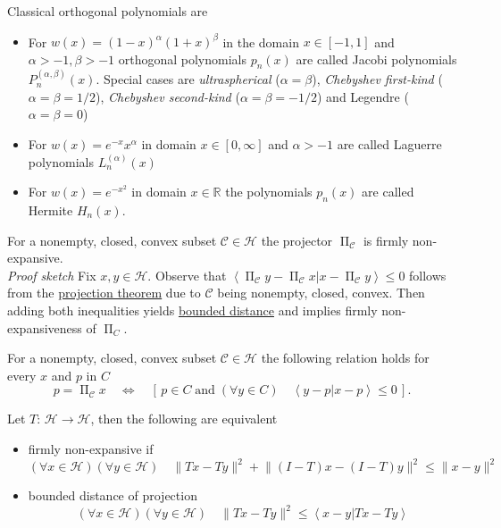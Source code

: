 \documentclass[preview, multi={definition, remark, theorem, proposition, example, literature}, border=0.2in]{standalone}
\DeclareMathOperator{\proj}{\Pi}
\newcommand{\innerp}[2]{\left\langle #1 \vert #2 \right\rangle}
\begin{document}
\begin{definition}[label=18x0c7vo, name=Orthogonal Polynomials]
	\begin{example}[label=m8pnoa7d, name=Classical Polynomials]
		Classical orthogonal polynomials are

		\begin{itemize}
			\item For \( w(x) = (1-x)^\alpha(1+x)^\beta \) in the domain \( x\in[-1,1] \)
				and \( \alpha > -1, \beta > -1 \) orthogonal
				polynomials \( p_n(x) \) are called Jacobi
				polynomials \( P_n^{(\alpha,\beta)}(x) \).
				Special cases are \emph{ultraspherical}
				(\(\alpha=\beta\)), \emph{Chebyshev first-kind}
				(\(\alpha=\beta=1/2\)), \emph{Chebyshev
				second-kind} (\( \alpha=\beta=-1/2 \)) and
				Legendre (\(\alpha=\beta=0\))
			\item For \( w(x) = e^{-x}x^\alpha \) in domain
				\(x\in[0,\infty]\) and \( \alpha > -1 \) are
				called Laguerre polynomials \( L_n^{(\alpha)}(x) \)
			\item For \(w(x) = e^{-x^2}\) in domain \(
				x\in\mathbb{R}\) the polynomials \(p_n(x)\) are
				called Hermite \(H_n(x)\).
		\end{itemize}
	\end{example}
\end{definition}
\begin{theorem}[label=o6y_7uuw, name=Projectors convex sets]
	For a nonempty, closed, convex subset \(\mathcal C \in \mathcal H\) the projector
	\(\proj_{\mathcal{C}}\) is firmly non-expansive. \\

	\textit{Proof sketch} Fix \( x, y \in \mathcal H\). Observe that \( \innerp{\proj_{\mathcal{C}}y - \proj_{\mathcal{C}}x}{x-\proj_{\mathcal{C}}y} \leq 0\) 
	follows from the \hyperref[e251pck0]{projection theorem} due to \(\mathcal C\) being nonempty, closed,
	convex. Then adding both inequalities yields \hyperref[bsrdg9do]{bounded distance}
	and implies firmly non-expansiveness of \(\proj_C\).
\end{theorem}

\begin{theorem}[label=e251pck0, name=Projection theorem]
	For a nonempty, closed, convex subset \( \mathcal C\in\mathcal H\) the
	following relation holds for every \(x\) and \(p\) in \(C\)
	\[
		p=\proj_{\mathcal{C}}x \quad\Leftrightarrow\quad [\,p\in
		C\;\text{and}\;(\forall y\in C)\quad\innerp{y-p}{x-p}\leq 0\,].
	\]
\end{theorem}

\begin{definition}[label=bsrdg9do, name=Firmly nonexpansive]
	Let \(T:\, \mathcal{H}\to\mathcal{H}\), then the following are
	equivalent
	\begin{itemize}
		\item firmly non-expansive if
		\[
			(\forall x\in\mathcal{H})(\forall y\in\mathcal{H})\quad\lVert Tx-Ty\rVert^2 + \lVert (I-T)x - (I-T)y\rVert^2 \leq \lVert x-y\rVert^2
		\]
		\item bounded distance of projection
		\[
			(\forall x\in\mathcal{H})(\forall y\in\mathcal{H})\quad \lVert Tx-Ty\rVert^2\leq\innerp{x-y}{Tx-Ty}
		\]
	\end{itemize}
\end{definition}
\end{document}
